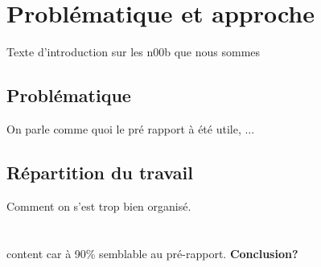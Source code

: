 \newpage
\section{Problématique et approche}
Texte d'introduction sur les n00b que nous sommes


	\subsection{Problématique}
	On parle comme quoi le pré rapport à été utile, ...
	
	
	\subsection{Répartition du travail}
	Comment on s'est trop bien organisé.\\
	\\
	\\
	content car à 90\% semblable au pré-rapport. \textbf{Conclusion?}















